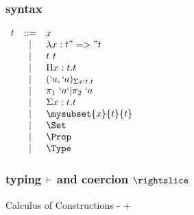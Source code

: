 \begin{frame}
  \frametitle{\lng{} syntax}
  
  $\begin{array}{lcl}
    t & \Coloneqq & x \\
    & | & \lambda x : t "=>" t \\
    & | & t~t \\
    & | & \Pi x : t. t \\

    & | & \pair{\Sigma x : t.t}{`a}{`a} \\
    & | & \pi_1~`a `| \pi_2~`a \\
    & | & \Sigma x : t. t \\

    & | & \mysubset{x}{t}{t} \\
    & | & \Set \\
    & | & \Prop \\
    & | & \Type
  \end{array}$  
\end{frame}

\begin{frame}[t,label=typingdecl]
  \frametitle{\lng{} typing $\vdash$ and coercion $\subd$}
  
  Calculus of Constructions -  +
  \typenvd
  \begin{center}
    \vspace{0.25cm}
    \Coerce\DP
    \def\fCenter{\subd}
    \SubConv\DP
    \pause
    \vspace{0.5cm}    
    \SubTrans\DP
    
    \vspace{0.25cm}

    \vspace{0.25cm}
  \end{center}

\end{frame}

